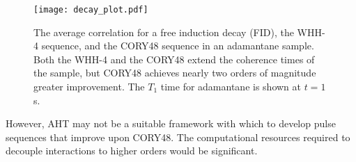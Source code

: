 \begin{figure}[H]
    \centering
    \texttt{[image: decay\_plot.pdf]}
    \caption{The average correlation for a free induction decay (FID), the WHH-4 sequence, and the CORY48 sequence in an adamantane sample. Both the WHH-4 and the CORY48 extend the coherence times of the sample, but CORY48 achieves nearly two orders of magnitude greater improvement. The $T_1$ time for adamantane is shown at $t=1$s.}
    \label{fig:decay_plot_AHT}
\end{figure}

However, AHT may not be a suitable framework with which to develop pulse sequences that improve upon CORY48. The computational resources required to decouple interactions to higher orders would be significant.
